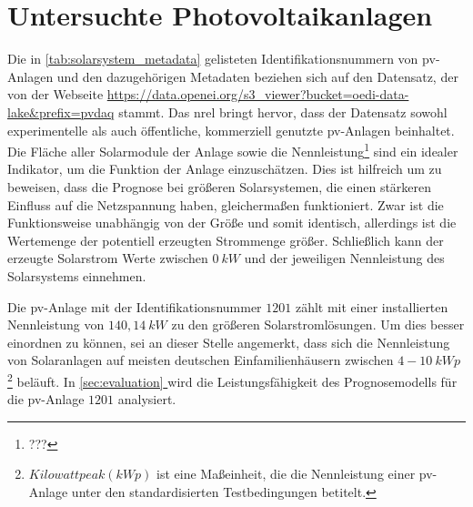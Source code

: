 \documentclass[12pt, a4paper]{article}
\newcommand*{\fullref}[1]{\hyperref[{#1}]{\autoref*{#1} \textit{\nameref*{#1}}}}
\begin{document}
\newpage

\section{Untersuchte Photovoltaikanlagen}

Die in \autoref{tab:solarsystem_metadata} gelisteten Identifikationsnummern von \ac{pv}-Anlagen und den dazugehörigen Metadaten beziehen sich auf den Datensatz, der von der Webseite \url{https://data.openei.org/s3_viewer?bucket=oedi-data-lake&prefix=pvdaq} \newline stammt. Das \ac{nrel} bringt hervor, dass der Datensatz sowohl experimentelle als auch öffentliche, kommerziell genutzte \ac{pv}-Anlagen beinhaltet. Die Fläche aller Solarmodule der Anlage sowie die Nennleistung\footnote{???} sind ein idealer Indikator, um die Funktion der Anlage einzuschätzen. Dies ist hilfreich um zu beweisen, dass die Prognose bei größeren Solarsystemen, die einen stärkeren Einfluss auf die Netzspannung haben, gleichermaßen funktioniert. Zwar ist die Funktionsweise unabhängig von der Größe und somit identisch, allerdings ist die Wertemenge der potentiell erzeugten Strommenge größer. Schließlich kann der erzeugte Solarstrom Werte zwischen $0 \ kW$ und der jeweiligen Nennleistung des Solarsystems einnehmen. 

Die \ac{pv}-Anlage mit der Identifikationsnummer $1201$ zählt mit einer installierten Nennleistung von $140,14 \ kW$ zu den größeren Solarstromlösungen. Um dies besser einordnen zu können, sei an dieser Stelle angemerkt, dass sich die Nennleistung von Solaranlagen auf meisten deutschen Einfamilienhäusern zwischen $4 - 10 \ kWp$ \footnote{$Kilowattpeak (kWp)$ ist eine Maßeinheit, die die Nennleistung einer \ac{pv}-Anlage unter den standardisierten Testbedingungen betitelt.} beläuft. In \fullref{sec:evaluation} wird die Leistungsfähigkeit des Prognosemodells für die \ac{pv}-Anlage $1201$ analysiert.
\end{document}
